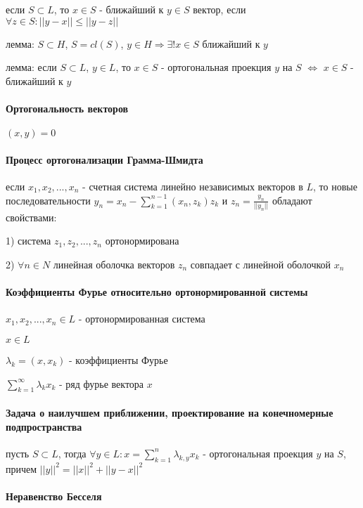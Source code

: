 \documentclass[russian,twocolumn]{article}
\begin{document}
если $S \subset L$, то $x \in S$ - ближайший к $ y \in S$ вектор, если $\forall z \in S : ||y-x||\le||y-z||$

лемма: $S \subset H$, $S=cl(S)$, $y \in H \Rightarrow \exists ! x \in S$ ближайший к $y$

лемма: если $S \subset L$, $y \in L$, то $x \in S$ - ортогональная проекция $y$ на $S$ $\iff$ $x \in S$ - ближайший к $y$ 


\paragraph{Ортогональность векторов} $(x,y)=0$

\paragraph{Процесс ортогонализации Грамма-Шмидта}

если $x_1,x_2,...,x_n$ - счетная система линейно независимых векторов в $L$, то новые последовательности $y_n=x_n-\sum_{k=1}^{n-1}(x_n,z_k)z_k$ и $z_n=\frac{y_{n}}{||y_{n}||}$ обладают свойствами:

1) система $z_{1},z_{2},...,z_{n}$ ортонормирована

2) $\forall n\in N$ линейная оболочка векторов $z_{n}$ совпадает с линейной оболочкой $x_{n}$

\paragraph{Коэффициенты Фурье относительно ортонормированной системы}

$x_1,x_2,...,x_n \in L$ - ортонормированная система

$x \in L$

$\lambda _k = (x, x_k)$ - коэффициенты Фурье

$\sum_{k=1}^{\infty}\lambda _k x_k$ - ряд фурье вектора $x$

\paragraph{Задача о наилучшем приближении, проектирование на конечномерные подпространства}

пусть $S \subset L$, тогда $\forall y \in L : x = \sum _{k=1}^n \lambda_{k,y} x_k$ - ортогональная проекция $y$ на $S$, причем $||y||^2 = ||x||^2 + ||y-x||^2$

\paragraph{Неравенство Бесселя}
\end{document}
